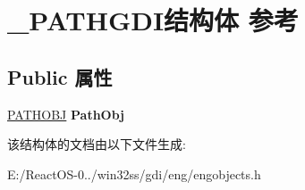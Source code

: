 \hypertarget{struct___p_a_t_h_g_d_i}{}\section{\+\_\+\+P\+A\+T\+H\+G\+D\+I结构体 参考}
\label{struct___p_a_t_h_g_d_i}
\subsection*{Public 属性}
\begin{DoxyCompactItemize}
\item 
\mbox{\label{struct___p_a_t_h_g_d_i_ab7f47f5a6fd8589be64b306359fcd9f2}} 
\hyperlink{struct___p_a_t_h_o_b_j}{P\+A\+T\+H\+O\+BJ} {\bfseries Path\+Obj}
\end{DoxyCompactItemize}


该结构体的文档由以下文件生成\+:\begin{DoxyCompactItemize}
\item 
E\+:/\+React\+O\+S-\/0../win32ss/gdi/eng/engobjects.\+h\end{DoxyCompactItemize}
